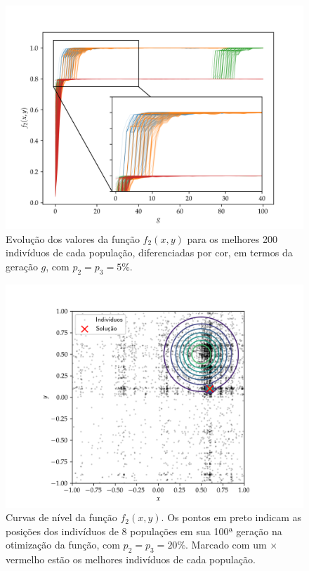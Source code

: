 \begin{figure}[p]
    \centering
    \includegraphics[width=\textwidth]{imagens/low_prob/evolution_near_gaussians.png}
    \caption{
        Evolução dos valores da função $ f_2(x,y) $ para os
        melhores 200 indivíduos de cada população, diferenciadas por cor, em termos da geração $g$,
        com $ p_2 = p_3 = 5\% $.
    }
    \label{fig:evolution_near_gaussians}
\end{figure}

\begin{figure}[p]
    \centering
    \includegraphics[width=\textwidth]{imagens/high_prob/contour_near_gaussians.png}
    \caption{
        Curvas de nível da função $f_2(x,y)$. Os pontos em preto indicam as posições dos indivíduos
        de 8 populações em sua 100ª geração na otimização da função, com $ p_2 = p_3 = 20\% $. 
        Marcado com um $\times$ vermelho estão os melhores indivíduos de cada população.
    }
    \label{fig:contour_near_gaussians_mut_20}
\end{figure}

